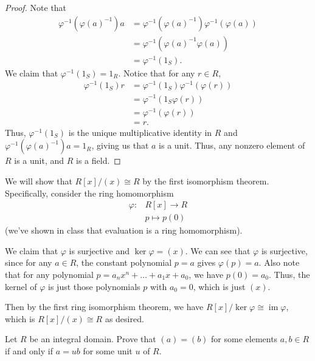 \documentclass[12 pt, letterpaper]{hmcpset}
\begin{document}
\begin{solution}
\begin{proof}
		Note that
		\[
			\begin{split}
				\varphi^{-1}(\varphi(a)^{-1}) a & = \varphi^{-1}(\varphi(a)^{-1}) \varphi^{-1}(\varphi(a)) \\
								& = \varphi^{-1}(\varphi(a)^{-1} \varphi(a)) \\
								& = \varphi^{-1}(1_{S}).
			\end{split}
		\]
		We claim that $\varphi^{-1}(1_{S}) = 1_{R}$. Notice that for any $r \in R$,
		\[
			\begin{split}
				\varphi^{-1}(1_{S}) r & = \varphi^{-1}(1_{S}) \varphi^{-1}(\varphi(r)) \\
						      & = \varphi^{-1}(1_{S} \varphi(r)) \\
						      & = \varphi^{-1}(\varphi(r)) \\
						      & = r.
			\end{split}
		\]
		Thus, $\varphi^{-1}(1_{S})$ is the unique multiplicative identity in $R$ and $\varphi^{-1}(\varphi(a)^{-1}) a = 1_{R}$, giving us that $a$ is a unit. Thus, any nonzero element of $R$ is a unit, and $R$ is a field.
	\end{proof}
	We will show that $R[x]/(x) \cong R$ by the first isomorphism theorem. Specifically, consider the ring homomorphism
	\[
		\begin{split}
			\varphi \colon & R[x] \to R \\
				       & p \mapsto p(0)
		\end{split}
	\]
	(we've shown in class that evaluation is a ring homomorphism). 

	
	We claim that $\varphi$ is surjective and $\ker \varphi = (x)$. We can see that $\varphi$ is surjective, since for any $a \in R$, the constant polynomial $p = a$ gives $\varphi(p) = a$.  Also note that for any polynomial $p = a_{n} x^{n} + \dots + a_{1} x + a_{0}$, we have $p(0) = a_{0}$. Thus, the kernel of $\varphi$ is just those polynomials $p$ with $a_{0} = 0$, which is just $(x)$. 

	
	Then by the first ring isomorphism theorem, we have $R[x]/\ker \varphi \cong \operatorname{im} \varphi$, which is $R[x]/(x) \cong R$ as desired. 

	
\end{solution}

\pagebreak

\begin{problem}
	Let $R$ be an integral domain. Prove that $(a) = (b)$ for some elements $a, b \in R$ if and only if $a = ub$ for some unit $u$ of $R$.
\end{problem}
\end{document}
